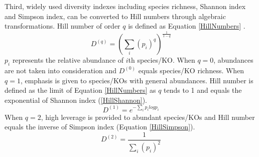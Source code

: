 \documentclass[11pt]{article}
\begin{document}
      Third, widely used diversity indexes including species richness, Shannon index and Simpson index, can be converted to Hill numbers through algebraic transformations. 
      \newline
      Hill number of order $q$ is defined as Equation \ref{HillNumbers} \citep{hill1973diversity}.
      \begin{equation}
        D^{(q)} = (\sum_{i}(p_i)^q)^{\frac{1}{1-q}}
        \label{HillNumbers}
      \end{equation}
      $p_i$ represents the relative abundance of $i$th species/KO. 
      When $q = 0$, abundances are not taken into consideration and $D^{(0)}$ equals species/KO richness. 
      When $q = 1$, emphasis is given to species/KOs with general abundances. 
      Hill number is defined as the limit of Equation \ref{HillNumbers} as $q$ tends to 1 and equals the exponential of Shannon index (\ref{HillShannon}).  
      \begin{equation}
        D^{(1)} = e^{-\sum_{i}p_ilogp_i}
        \label{HillShannon}
      \end{equation}
      When $q = 2$, high leverage is provided to abundant species/KOs and Hill number equals the inverse of Simpson index (Equation \ref{HillSimpson}).
      \begin{equation}
        D^{(2)} = \frac{1}{\sum_{i}(p_i)^2}
        \label{HillSimpson}
      \end{equation}
\end{document}
